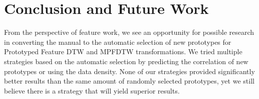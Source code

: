 \chapter{Conclusion and Future Work}



From the perspective of feature work, we see an opportunity for possible research in converting the manual to the automatic selection of new prototypes for Prototyped Feature DTW and MPFDTW transformations. We tried multiple strategies based on the automatic selection by predicting the correlation of new prototypes or using the data density. None of our strategies provided significantly better results than the same amount of randomly selected prototypes, yet we still believe there is a strategy that will yield superior results.